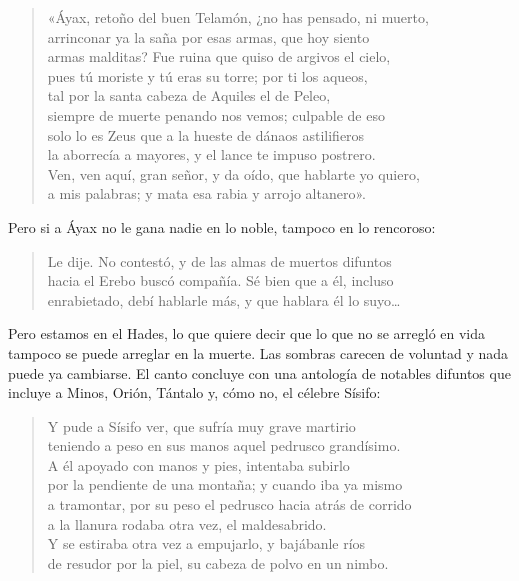 \documentclass[11pt,a4paper]{article}
\begin{document}
\begin{verse}
«Áyax, retoño del buen Telamón, ¿no has pensado, ni muerto,\\
arrinconar ya la saña por esas armas, que hoy siento\\
armas malditas? Fue ruina que quiso de argivos el cielo,\\
pues tú moriste y tú eras su torre; por ti los aqueos,\\
tal por la santa cabeza de Aquiles el de Peleo,\\
siempre de muerte penando nos vemos; culpable de eso\\
solo lo es Zeus que a la hueste de dánaos astilifieros\\
la aborrecía a mayores, y el lance te impuso postrero.\\
Ven, ven aquí, gran señor, y da oído, que hablarte yo quiero,\\
a mis palabras; y mata esa rabia y arrojo altanero».
\end{verse}

Pero si a Áyax no le gana nadie en lo noble, tampoco en lo rencoroso:

\begin{verse}
Le dije. No contestó, y de las almas de muertos difuntos\\
hacia el Erebo buscó compañía. Sé bien que a él, incluso\\
enrabietado, debí hablarle más, y que hablara él lo suyo…
\end{verse}

Pero estamos en el Hades, lo que quiere decir que lo que no se arregló en vida tampoco se puede arreglar en la muerte. Las sombras carecen de voluntad y nada puede ya cambiarse. El canto concluye con una antología de notables difuntos que incluye a Minos, Orión, Tántalo y, cómo no, el célebre Sísifo:

\begin{verse}
Y pude a Sísifo ver, que sufría muy grave martirio\\
teniendo a peso en sus manos aquel pedrusco grandísimo.\\
A él apoyado con manos y pies, intentaba subirlo\\
por la pendiente de una montaña; y cuando iba ya mismo\\
a tramontar, por su peso el pedrusco hacia atrás de corrido\\
a la llanura rodaba otra vez, el maldesabrido.\\
Y se estiraba otra vez a empujarlo, y bajábanle ríos\\
de resudor por la piel, su cabeza de polvo en un nimbo.
\end{verse}
\end{document}
